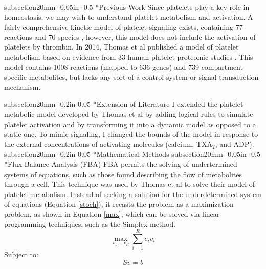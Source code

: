 \documentclass[11pt]{article}
\makeatletter
\renewcommand\subsection{\@startsection
	{subsection}{2}{0mm}
	{-0.05in}
	{-0.5\baselineskip}
	{\normalfont\normalsize\bfseries}}
\renewcommand\section{\@startsection
	{subsection}{2}{0mm}
	{-0.2in}
	{0.05\baselineskip}
	{\normalfont\large\bfseries}}
\makeatother
\begin{document}
\subsection*{Previous Work}
Since platelets play a key role in homeostasis, we may wish to understand platelet metabolism and activation. A fairly comprehensive kinetic model of platelet signaling exists, containing 77 reactions and 70 species \cite{purvis2008molecular}, however, this model does not include the activation of platelets by thrombin. In 2014, Thomas et al published a model of platelet metabolism based on evidence from 33 human platelet proteomic studies \cite{thomas2014network}. This model contains 1008 reactions (mapped to 636 genes) and 739 compartment specific metabolites, but lacks any sort of a control system or signal transduction mechanism.  

\section*{Extension of Literature}
I extended the platelet metabolic model developed by Thomas et al by adding logical rules to simulate platelet activation and by transforming it into a dynamic model as opposed to a static one. To mimic signaling, I changed the bounds of the model in response to the external concentrations of activating molecules (calcium, TXA$_2$, and ADP).
\section*{Mathematical Methods}
\subsection*{Flux Balance Analysis (FBA)}
FBA permits the solving of undertermined systems of equations, such as those found describing the flow of metabolites through a cell. This technique was used by Thomas et al to solve their model of platelet metabolism. Instead of seeking a solution for the underdetermined system of equations (Equation \ref{stoch}), it recasts the problem as a maximization problem, as shown in Equation \ref{max}, which can be solved via linear programming techniques, such as the Simplex method.
\begin{equation}
\max_{v_1,...v_R}\sum_{i=1}^Rc_iv_i
\label{max}
\end{equation}
Subject to:
\begin{equation}
Sv=b
\label{stoch}
\end{equation}
\end{document}
